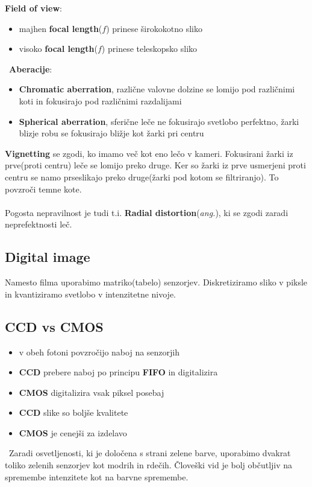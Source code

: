 \documentclass[11pt]{article}
\begin{document}
\textbf{Field of view}:
\begin{itemize}
\item majhen \textbf{focal length}($f$) prinese \v{s}irokokotno sliko
\item visoko \textbf{focal length}($f$) prinese teleskopsko sliko
\end{itemize}
\
\textbf{Aberacije}:
\begin{itemize}
\item \textbf{Chromatic aberration}, razli\v{c}ne valovne dolzine se lomijo pod razli\v{c}nimi koti in fokusirajo pod razli\v{c}nimi razdalijami
\item \textbf{Spherical aberration}, sferi\v{c}ne le\v{c}e ne fokusirajo svetlobo perfektno, \v{z}arki blizje robu se fokusirajo bli\v{z}je kot \v{z}arki pri centru
\end{itemize}

\newpage

\textbf{Vignetting} se zgodi, ko imamo ve\v{c} kot eno le\v{c}o v kameri. Fokusirani \v{z}arki iz prve(proti centru) le\v{c}e se lomijo preko druge. Ker so \v{z}arki iz prve usmerjeni proti centru se namo prseslikajo preko druge(\v{z}arki pod kotom se filtriranjo). To povzro\v{c}i temne kote.\\
\\
Pogosta nepravilnost je tudi t.i. \textbf{Radial distortion}(\textit{ang.}), ki se zgodi zaradi neprefektnosti le\v{c}.

\subsection{Digital image}
Namesto filma uporabimo matriko(tabelo) senzorjev. Diskretiziramo sliko v piksle in kvantiziramo svetlobo v intenzitetne nivoje.

\subsection{CCD vs CMOS}
\begin{itemize}
\item v obeh fotoni povzro\v{c}ijo naboj na senzorjih
\item \textbf{CCD} prebere naboj po principu \textbf{FIFO} in digitalizira
\item \textbf{CMOS} digitalizira vsak piksel posebaj
\item \textbf{CCD} slike so bolj\v{s}e kvalitete
\item \textbf{CMOS} je cenej\v{s}i za izdelavo
\end{itemize}
\
Zaradi osvetljenosti, ki je dolo\v{c}ena s strani zelene barve, uporabimo dvakrat toliko zelenih senzorjev kot modrih in rde\v{c}ih. \v{C}love\v{s}ki vid je bolj ob\v{c}utljiv na spremembe intenzitete kot na barvne spremembe.
\end{document}
